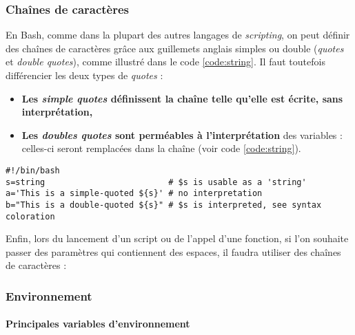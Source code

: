 \newpage

\subsubsection{Chaînes de caractères} \label{sec:string}
En Bash, comme dans la plupart des autres langages de \textit{scripting}, on peut définir des chaînes de caractères grâce aux guillemets anglais simples ou double (\textit{quotes} et \textit{double quotes}), comme illustré dans le code \ref{code:string}. Il faut toutefois différencier les deux types de \textit{quotes} : 
\begin{itemize}
    \item \textbf{Les \textit{simple quotes} définissent la chaîne telle qu'elle est écrite, sans interprétation,}
    \item \textbf{Les \textit{doubles quotes} sont perméables à l'interprétation} des variables : celles-ci seront remplacées dans la chaîne (voir code \ref{code:string}).
\end{itemize}

\vspace{5mm}
\begin{code}
    \begin{verbatim}
#!/bin/bash
s=string                         # $s is usable as a 'string'
a='This is a simple-quoted ${s}' # no interpretation
b="This is a double-quoted ${s}" # $s is interpreted, see syntax coloration
    \end{verbatim}

    \vspace{-0.5cm}
    \label{code:string}
\end{code}

Enfin, lors du lancement d'un script ou de l'appel d'une fonction, si l'on souhaite passer des paramètres qui contiennent des espaces, il faudra utiliser des chaînes de caractères : 

\subsubsection{Environnement}

\paragraph{Principales variables d'environnement} \label{sec:env}

